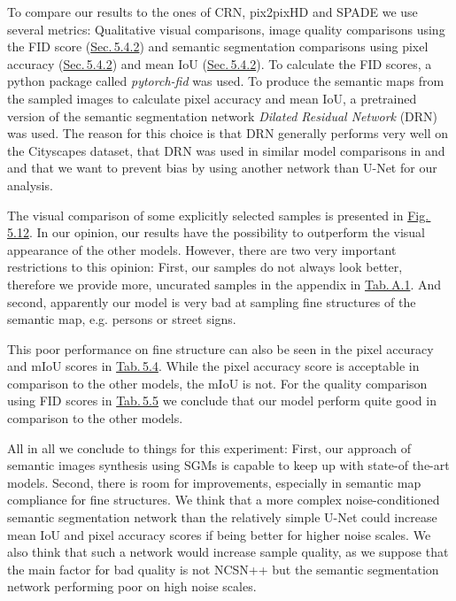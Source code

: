 To compare our results to the ones of CRN, pix2pixHD and SPADE we use several metrics: Qualitative visual comparisons, image quality comparisons using the FID score (\hyperref[sec:fid]{Sec.\,5.4.2}) and semantic segmentation comparisons using pixel accuracy (\hyperref[sec:acc]{Sec.\,5.4.2}) and mean IoU (\hyperref[sec:fid]{Sec.\,5.4.2}). To calculate the FID scores, a python package called \textit{pytorch-fid} \cite{fid_pytorch} was used. To produce the semantic maps from the sampled images to calculate pixel accuracy and mean IoU, a pretrained version of the semantic segmentation network \textit{Dilated Residual Network} (DRN) \cite{drn} was used. The reason for this choice is that DRN generally performs very well on the Cityscapes dataset, that DRN was used in similar model comparisons in \cite{pix2pix} and \cite{spade} and that we want to prevent bias by using another network than U-Net for our analysis.
 
The visual comparison of some explicitly selected samples is presented in \hyperref[fig:5.12]{Fig.\,5.12}. In our opinion, our results have the possibility to outperform the visual appearance of the other models. However, there are two very important restrictions to this opinion: First, our samples do not always look better, therefore we provide more, uncurated samples in the appendix in \hyperref[tab:a1]{Tab.\,A.1}. And second, apparently our model is very bad at sampling fine structures of the semantic map, e.g. persons or street signs. 

This poor performance on fine structure can also be seen in the pixel accuracy and mIoU scores in \hyperref[tab:5.4]{Tab.\,5.4}. While the pixel accuracy score is acceptable in comparison to the other models, the mIoU is not. For the quality comparison using FID scores in \hyperref[tab:5.5]{Tab.\,5.5} we conclude that our model perform quite good in comparison to the other models.

All in all we conclude to things for this experiment: First, our approach of semantic images synthesis using SGMs is capable to keep up with state-of the-art models. Second, there is room for improvements, especially in semantic map compliance for fine structures. We think that a more complex noise-conditioned semantic segmentation network than the relatively simple U-Net could increase mean IoU and pixel accuracy scores if being better for higher noise scales. We also think that such a network would increase sample quality, as we suppose that the main factor for bad quality is not NCSN++ but the semantic segmentation network performing poor on high noise scales.

